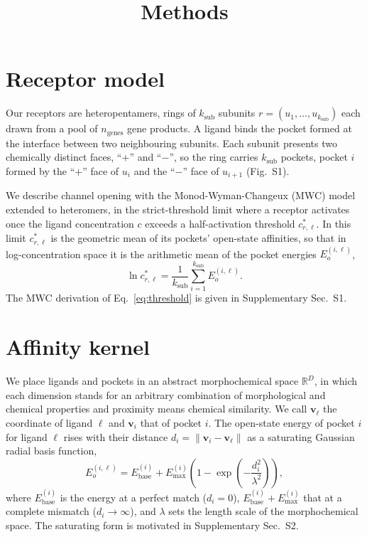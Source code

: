 \documentclass[aps,pre,superscriptaddress,floatfix,longbibliography,linenumbers]{revtex4-2}
\begin{document}
\title{Methods}

\maketitle

\section{Receptor model}
\label{sec:receptor}

Our receptors are heteropentamers, rings of $k_\text{sub}$ subunits
$r=(u_1,\dots,u_{k_\text{sub}})$ each drawn from a pool of $n_\text{genes}$
gene products. A ligand binds the pocket formed at the interface between two
neighbouring subunits. Each subunit presents two chemically distinct faces,
``$+$'' and ``$-$'', so the ring carries $k_\text{sub}$ pockets, pocket $i$
formed by the ``$+$'' face of $u_i$ and the ``$-$'' face of $u_{i+1}$
(Fig.~S1).

We describe channel opening with the Monod-Wyman-Changeux (MWC) model
extended to heteromers, in the strict-threshold limit where a receptor
activates once the ligand concentration $c$ exceeds a half-activation
threshold $c^*_{r,\ell}$. In this limit $c^*_{r,\ell}$ is the geometric mean
of its pockets' open-state affinities, so that in log-concentration space it
is the arithmetic mean of the pocket energies $E_o^{(i,\ell)}$,
\begin{equation}
\ln c^*_{r,\ell} = \frac{1}{k_\text{sub}}\sum_{i=1}^{k_\text{sub}} E_o^{(i,\ell)}.
\label{eq:threshold}
\end{equation}
The MWC derivation of Eq.~\eqref{eq:threshold} is given in Supplementary
Sec.~S1.

\section{Affinity kernel}
\label{sec:kernel}

We place ligands and pockets in an abstract morphochemical space
$\mathbb R^D$, in which each dimension stands for an arbitrary combination of
morphological and chemical properties and proximity means chemical
similarity. We call $\mathbf v_\ell$ the coordinate of ligand $\ell$ and
$\mathbf v_i$ that of pocket $i$. The open-state energy of pocket $i$ for
ligand $\ell$ rises with their distance $d_i=\|\mathbf v_i-\mathbf v_\ell\|$
as a saturating Gaussian radial basis function,
\begin{equation}
E_o^{(i,\ell)} = E_\text{base}^{(i)} + E_\text{max}^{(i)}\left(1-\exp\left(-\frac{d_i^2}{\lambda^2}\right)\right),
\label{eq:kernel}
\end{equation}
where $E_\text{base}^{(i)}$ is the energy at a perfect match ($d_i=0$),
$E_\text{base}^{(i)}+E_\text{max}^{(i)}$ that at a complete mismatch
($d_i\to\infty$), and $\lambda$ sets the length scale of the morphochemical
space. The saturating form is motivated in Supplementary Sec.~S2.
\end{document}
